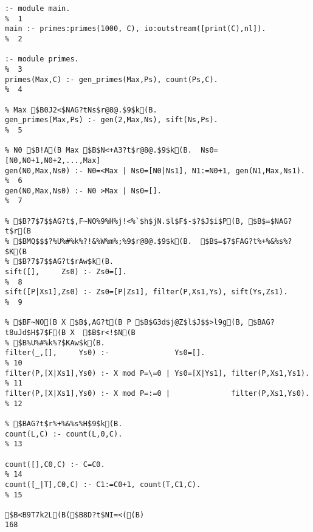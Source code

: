{{{{{{{{{\begin{verbatim}
:- module main.                                                           %  1
main :- primes:primes(1000, C), io:outstream([print(C),nl]).              %  2

:- module primes.                                                         %  3
primes(Max,C) :- gen_primes(Max,Ps), count(Ps,C).                         %  4

% Max $B0J2<$NAG?tNs$r@8@.$9$k(B.
gen_primes(Max,Ps) :- gen(2,Max,Ns), sift(Ns,Ps).                         %  5

% N0 $B!A(B Max $B$N<+A3?t$r@8@.$9$k(B.  Ns0=[N0,N0+1,N0+2,...,Max]
gen(N0,Max,Ns0) :- N0=<Max | Ns0=[N0|Ns1], N1:=N0+1, gen(N1,Max,Ns1).     %  6
gen(N0,Max,Ns0) :- N0 >Max | Ns0=[].                                      %  7

% $B?7$7$$AG?t$,F~NO%9%H%j!<%`$h$jN.$l$F$-$?$J$i$P(B, $B$=$NAG?t$r(B
% $BMQ$$$?%U%#%k%?!&%W%m%;%9$r@8@.$9$k(B.  $B$=$7$FAG?t%+%&%s%?$K(B
% $B?7$7$$AG?t$rAw$k(B.
sift([],     Zs0) :- Zs0=[].                                              %  8
sift([P|Xs1],Zs0) :- Zs0=[P|Zs1], filter(P,Xs1,Ys), sift(Ys,Zs1).         %  9

% $BF~NO(B X $B$,AG?t(B P $B$G3d$j@Z$l$J$$>l9g(B, $BAG?t8uJd$H$7$F(B X  $B$r<!$N(B
% $B%U%#%k%?$KAw$k(B.
filter(_,[],     Ys0) :-               Ys0=[].                            % 10
filter(P,[X|Xs1],Ys0) :- X mod P=\=0 | Ys0=[X|Ys1], filter(P,Xs1,Ys1).    % 11
filter(P,[X|Xs1],Ys0) :- X mod P=:=0 |              filter(P,Xs1,Ys0).    % 12

% $BAG?t$r%+%&%s%H$9$k(B.
count(L,C) :- count(L,0,C).                                               % 13

count([],C0,C) :- C=C0.                                                   % 14
count([_|T],C0,C) :- C1:=C0+1, count(T,C1,C).                             % 15

$B<B9T7k2L(B($B8D?t$NI=<((B)
168
\end{verbatim}

\newpage

\answer{20,000 $B0J2<$NAG?tNs$r@8@.$9$k%

$BMW5a6nF0$N%

\subsection*{$BMW5a6nF0$N%

}}}}}}}}}}}
